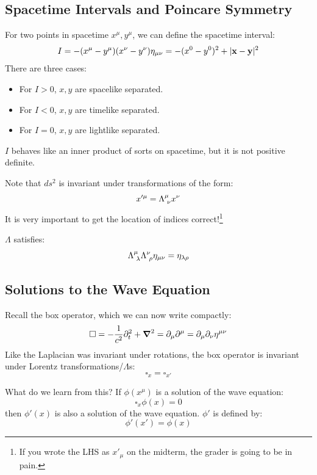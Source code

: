 \subsection{Spacetime Intervals and Poincare Symmetry}
For two points in spacetime $x^\mu, y^\mu$, we can define the spacetime interval:
\begin{equation}
    I = -(x^\mu - y^\mu)(x^\nu - y^\nu)\eta_{\mu\nu} = -(x^0 - y^0)^2 + \lvert \mathbf{x} - \mathbf{y} \rvert^2
\end{equation}
There are three cases:
\begin{itemize}
    \item For $I > 0$, $x, y$ are spacelike separated.
    \item For $I < 0$, $x, y$ are timelike separated.
    \item For $I = 0$, $x, y$ are lightlike separated.
\end{itemize}
$I$ behaves like an inner product of sorts on spacetime, but it is not positive definite.

Note that $ds^2$ is invariant under transformations of the form:
\begin{equation}
    x'^\mu = \Lambda^{\mu}_{\sp\nu}x^\nu
\end{equation}
It is very important to get the location of indices correct!\footnote{If you wrote the LHS as $x'_\mu$ on the midterm, the grader is going to be in pain.}

$\Lambda$ satisfies:
\begin{equation}
    \Lambda^\mu_{\sp\lambda}\Lambda^{\nu}_{\sp\rho}\eta_{\mu\nu} = \eta_{\lambda\rho}
\end{equation}

\subsection{Solutions to the Wave Equation}

Recall the box operator, which we can now write compactly:
\begin{equation}
    \square = -\frac{1}{c^2}\p_t^2  +\nabla^2 = \p_\mu \p^\mu = \p_\mu \p_\nu \eta^{\mu\nu}
\end{equation}
Like the Laplacian was invariant under rotations, the box operator is invariant under Lorentz transformations/$\Lambda$s:
\begin{equation}
    \square_x = \square_{x'}
\end{equation}

What do we learn from this? If $\phi(x^\mu)$ is a solution of the wave equation:
\begin{equation}
    \square_x \phi(x) = 0
\end{equation}
then $\phi'(x)$ is also a solution of the wave equation. $\phi'$ is defined by:
\begin{equation}
    \phi'(x') = \phi(x)
\end{equation}

